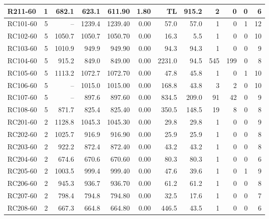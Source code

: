 \documentclass[10pt]{article}
\begin{document}
\begin{table}[p]
\begin{tabular}{lrrrrrrrrrrr}
R211-60 & 1 & 682.1 & 623.1 & 611.90 & 1.80 & TL & 915.2 & 2 & 0 & 0 & 6 \\
\midrule
RC101-60 & 5 & -- & 1239.4 & 1239.40 & 0.00 & 57.0 & 57.0 & 1 & 0 & 1 & 12 \\
RC102-60 & 5 & 1050.7 & 1050.7 & 1050.70 & 0.00 & 16.3 & 5.5 & 1 & 0 & 0 & 10 \\
RC103-60 & 5 & 1010.9 & 949.9 & 949.90 & 0.00 & 94.3 & 94.3 & 1 & 0 & 0 & 9 \\
RC104-60 & 5 & 915.2 & 849.0 & 849.00 & 0.00 & 2231.0 & 94.5 & 545 & 199 & 0 & 8 \\
RC105-60 & 5 & 1113.2 & 1072.7 & 1072.70 & 0.00 & 47.8 & 45.8 & 1 & 0 & 1 & 10 \\
RC106-60 & 5 & -- & 1015.0 & 1015.00 & 0.00 & 168.8 & 43.8 & 3 & 2 & 0 & 10 \\
RC107-60 & 5 & -- & 897.6 & 897.60 & 0.00 & 834.5 & 209.0 & 91 & 42 & 0 & 9 \\
RC108-60 & 5 & 871.7 & 825.4 & 825.40 & 0.00 & 350.5 & 148.5 & 19 & 8 & 0 & 8 \\
\midrule
RC201-60 & 2 & 1128.8 & 1045.3 & 1045.30 & 0.00 & 29.8 & 29.8 & 1 & 0 & 0 & 9 \\
RC202-60 & 2 & 1025.7 & 916.9 & 916.90 & 0.00 & 25.9 & 25.9 & 1 & 0 & 0 & 8 \\
RC203-60 & 2 & 922.2 & 872.4 & 872.40 & 0.00 & 43.2 & 43.2 & 1 & 0 & 0 & 8 \\
RC204-60 & 2 & 674.6 & 670.6 & 670.60 & 0.00 & 80.3 & 80.3 & 1 & 0 & 0 & 6 \\
RC205-60 & 2 & 1003.5 & 999.4 & 999.40 & 0.00 & 47.6 & 39.6 & 1 & 0 & 1 & 9 \\
RC206-60 & 2 & 945.3 & 936.7 & 936.70 & 0.00 & 61.2 & 61.2 & 1 & 0 & 0 & 8 \\
RC207-60 & 2 & 798.4 & 794.8 & 794.80 & 0.00 & 32.5 & 17.6 & 1 & 0 & 0 & 7 \\
RC208-60 & 2 & 667.3 & 664.8 & 664.80 & 0.00 & 446.5 & 43.5 & 1 & 0 & 0 & 6 \\
\bottomrule
\end{tabular}
\end{table}
\clearpage
\end{document}
